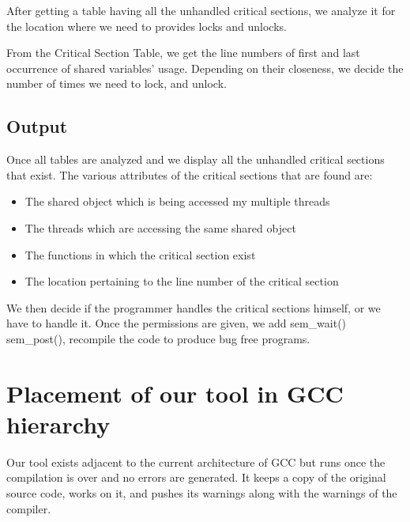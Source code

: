 After getting a table having all the unhandled critical sections, we analyze it for the location where we need to provides locks and unlocks. 

From the Critical Section Table, we get the line numbers of first and last occurrence of shared variables’ usage. Depending on their closeness, we decide the number of times we need to lock, and unlock.

\subsection{Output}
Once all tables are analyzed and we display all the unhandled critical sections that exist. The various attributes of the critical sections that are found are: 
\begin{itemize}

\item The shared object which is being accessed my multiple threads

\item The threads which are accessing the same shared object

\item The functions in which the critical section exist

\item The location pertaining to the line number of the critical section

\end{itemize}

We then decide if the programmer handles the critical sections himself, or we have to handle it. Once the permissions are given, we add sem\_wait() sem\_post(), recompile the code to produce bug free programs.

\section{Placement of our tool in GCC hierarchy}
Our tool exists adjacent to the current architecture of GCC but runs once the compilation is over and no errors are generated. It keeps a copy of the original source code, works on it, and pushes its warnings along with the warnings of the compiler.

